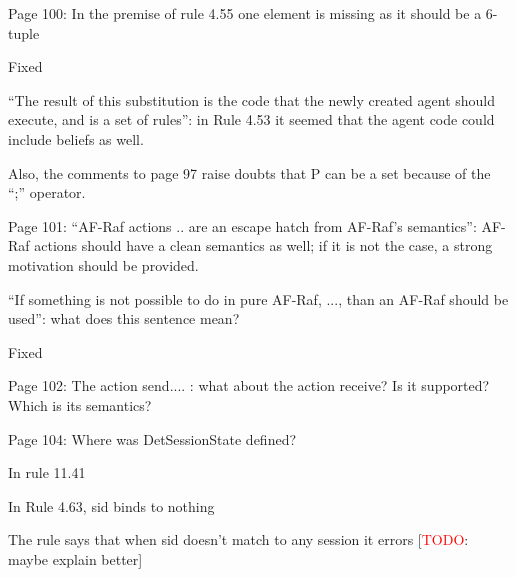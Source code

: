 \documentclass{article}
\newcommand{\todo}[1]{[\textcolor{red}{TODO}: #1]}
\newenvironment{them}{\noindent\begingroup\color{blue}}{\endgroup\par}
\begin{document}
\begin{them}

Page 100:
In the premise of rule 4.55 one element is missing as it should be a 6-tuple
\end{them}
Fixed

\begin{them}

“The result of this substitution is the code that the newly created agent
should execute, and is a set of rules”: in Rule 4.53 it seemed that the agent
code could include beliefs as well.

\end{them}
\todo{}

\begin{them}

Also, the comments to page 97 raise doubts that P can be a set because of the
“;” operator.

\end{them}
\todo{}

\begin{them}

Page 101:
“AF-Raf actions .. are an escape hatch from AF-Raf's semantics”: AF-Raf actions
should have a clean semantics as well; if it is not the case, a strong
motivation should be provided.

\end{them}
\todo{}

\begin{them}

“If something is not possible to do in pure AF-Raf, ..., than an AF-Raf should
be used”: what does this sentence mean?

\end{them}
Fixed

\begin{them}

Page 102:
The action send.... : what about the action receive? Is it supported? Which is
its semantics?

\end{them}
\todo{}

\begin{them}

Page 104:
Where was DetSessionState defined?
\end{them}
In rule 11.41

\begin{them}

In Rule 4.63, sid binds to nothing
\end{them}
The rule says that when sid doesn't match to any session it errors
\todo{maybe explain better}
\end{document}
